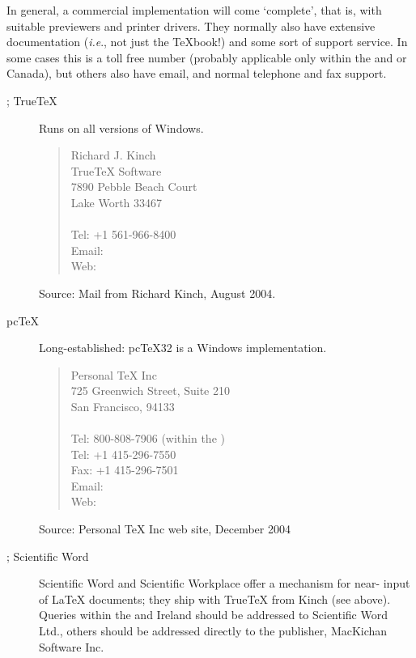In general, a commercial implementation will come `complete', that is,
with suitable previewers and printer drivers.  They normally also have
extensive documentation (\emph{i.e}., not just the \TeX{}book!) and some
sort of support service.  In some cases this is a toll free number
(probably applicable only within the  and or Canada), but others
also have email, and normal telephone and fax support.
\begin{description}
\item[; True\TeX{}] Runs on all versions of Windows.
  \begin{quote}
    Richard J. Kinch\\
    TrueTeX Software\\
    7890 Pebble Beach Court\\
    Lake Worth  33467\\
    \\[.25\baselineskip]
    Tel: +1 561-966-8400\\
    Email: \\
    Web: 
  \end{quote}
  Source: Mail from Richard Kinch, August 2004.
\item[pc\TeX{}] Long-established: pc\TeX{}32 is a Windows implementation.
  \begin{quote}
    Personal \TeX{} Inc\\
    725 Greenwich Street, Suite 210 \\
    San Francisco,  94133\\
    \\[.25\baselineskip]
    Tel: 800-808-7906 (within the )\\
    Tel: +1 415-296-7550\\
    Fax: +1 415-296-7501\\
    Email: \\
    Web: 
  \end{quote}
  Source: Personal \TeX{} Inc web site, December 2004
\item[; Scientific Word] Scientific Word and Scientific Workplace
  offer a mechanism for near-\WYSIWYG{} input of \LaTeX{} documents; they
  ship with True\TeX{} from Kinch (see above).  Queries within the 
  and Ireland should be addressed to Scientific Word Ltd., others should be
  addressed directly to the publisher, MacKichan Software Inc.
  \begin{quote}

\end{quote}
\end{description}
